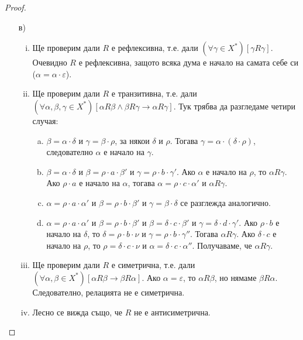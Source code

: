 \begin{proof}
  \begin{enumerate}[1)]
  \item[в)]
    \begin{enumerate}[(i)]
    \item
      Ще проверим дали $R$ е рефлексивна, т.е. дали $(\forall\gamma\in X^{*})[\gamma R\gamma]$.
      Очевидно $R$ е рефлексивна, защото всяка дума е начало на самата себе си ($\alpha = \alpha\cdot\varepsilon$).
    \item
      Ще проверим дали $R$ е транзитивна, т.е. дали $(\forall\alpha,\beta,\gamma\in X^*)[\alpha R\beta\wedge\beta R\gamma\rightarrow\alpha R\gamma]$.
      Тук трябва да разгледаме четири случая:
      \begin{enumerate}[a)]
      \item
        $\beta = \alpha\cdot\delta$ и $\gamma = \beta\cdot\rho$, за някои $\delta$ и $\rho$.
        Тогава $\gamma = \alpha\cdot(\delta\cdot\rho)$, следователно $\alpha$ е начало на $\gamma$.
      \item
        $\beta = \alpha\cdot\delta$ и $\beta = \rho\cdot a\cdot \beta'$ и $\gamma = \rho\cdot b\cdot\gamma'$.
        Ако $\alpha$ е начало на $\rho$, то $\alpha R \gamma$.
        Ако $\rho\cdot a$ е начало на $\alpha$, тогава $\alpha = \rho\cdot c\cdot\alpha'$ и $\alpha R \gamma$.
      \item
        $\alpha = \rho\cdot a\cdot \alpha'$ и $\beta = \rho\cdot b\cdot\beta'$ и $\gamma = \beta\cdot\delta$ се разглежда аналогично.
      \item
        $\alpha = \rho\cdot a\cdot \alpha'$ и $\beta = \rho\cdot b\cdot\beta'$ и $\beta = \delta\cdot c\cdot \beta'$ и $\gamma = \delta\cdot d\cdot\gamma'$.
        Ако $\rho\cdot b$ е начало на $\delta$, то $\delta = \rho\cdot b\cdot\nu$ и $\gamma = \rho\cdot b\cdot \gamma''$. Тогава $\alpha R \gamma$.
        Ако $\delta\cdot c$ е начало на $\rho$, то $\rho = \delta\cdot c\cdot\nu$ и $\alpha = \delta\cdot c\cdot\alpha''$. Получаваме, че 
        $\alpha R \gamma$.
      \end{enumerate}
    \item
      Ще проверим дали $R$ е симетрична, т.е. дали $(\forall\alpha,\beta\in X^*)[\alpha R\beta \rightarrow \beta R\alpha]$.
      Ако $\alpha = \varepsilon$, то $\alpha R\beta$, но нямаме $\beta R\alpha$.
      Следователно, релацията не е симетрична.
    \item
      Лесно се вижда също, че $R$ не е антисиметрична.
    \end{enumerate}
    
  \end{enumerate}
  
\end{proof}


